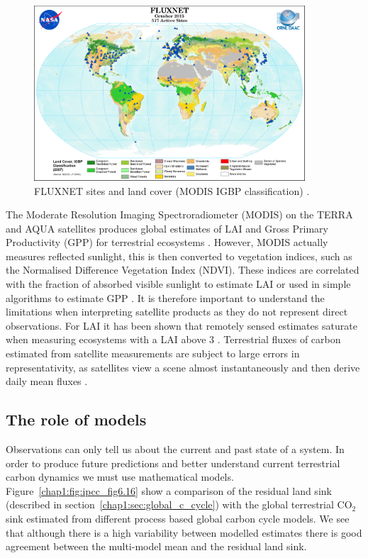 \begin{figure}[ht]
\centering
\includegraphics[width=0.9\textwidth]{chapter/chapter1/FluxNetworkMODIS_IGBP_10-2015.png}
\caption{FLUXNET sites and land cover (MODIS IGBP classification) \citep{fluxnetsite2013}.}
\label{chap1:fig:fluxnet_2015}
\end{figure}

The Moderate Resolution Imaging Spectroradiometer (MODIS) on the TERRA and AQUA satellites produces global estimates of LAI and Gross Primary Productivity (GPP) for terrestrial ecosystems \citep{running2004continuous}. However, MODIS actually measures reflected sunlight, this is then converted to vegetation indices, such as the Normalised Difference Vegetation Index (NDVI). These indices are correlated with the fraction of absorbed visible sunlight to estimate LAI or used in simple algorithms to estimate GPP \citep{yuan2007deriving}. It is therefore important to understand the limitations when interpreting satellite products as they do not represent direct observations. For LAI it has been shown that remotely sensed estimates saturate when measuring ecosystems with a LAI above 3 \citep{myneni2002global}. Terrestrial fluxes of carbon estimated from satellite measurements are subject to large errors in representativity, as satellites view a scene almost instantaneously and then derive daily mean fluxes \citep{baldocchi2008turner}. 

\subsection{The role of models}

Observations can only tell us about the current and past state of a system. In order to produce future predictions and better understand current terrestrial carbon dynamics we must use mathematical models. Figure~\ref{chap1:fig:ipcc_fig6.16} show a comparison of the residual land sink (described in section~\ref{chap1:sec:global_c_cycle}) with the global terrestrial CO\(_{2}\) sink estimated from different process based global carbon cycle models. We see that although there is a high variability between modelled estimates there is good agreement between the multi-model mean and the residual land sink. 

